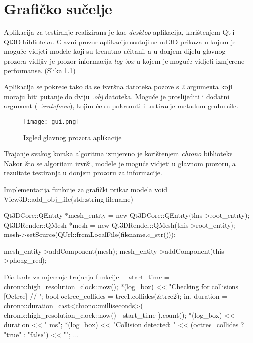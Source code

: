 \chapter{Grafičko sučelje}

Aplikacija za testiranje realizirana je kao \textit{desktop} aplikacija,
korištenjem Qt i Qt3D biblioteka. Glavni prozor aplikacije sastoji se od 
3D prikaza u kojem je moguće vidjeti modele koji su trenutno učitani, a
u donjem dijelu glavnog prozora vidljiv je prozor informacija \textit{log box}
u kojem je moguće vidjeti izmjerene performanse. (Slika \ref{gui})

Aplikacija se pokreće tako da se izvršna datoteka pozove s 2 argumenta koji moraju
biti putanje do dviju \textit{.obj} datoteka. Moguće je proslijediti i dodatni argument
(\textit{--bruteforce}), kojim će se pokrenuti i testiranje metodom grube sile.

\begin{figure}[h!]
    \centering
    \texttt{[image: gui.png]}
    \caption {Izgled glavnog prozora aplikacije}
    \label{gui}
\end{figure}

Trajanje svakog koraka algoritma izmjereno je korištenjem \textit{chrono} biblioteke
Nakon što se algoritam izvrši, modele je moguće vidjeti u glavnom prozoru, a rezultate
testiranja u donjem prozoru za informacije.

\begin{cppSource}{Implementacija funkcije za grafički prikaz modela}
void View3D::add_obj_file(std::string filename) {
    Qt3DCore::QEntity *mesh_entity = new Qt3DCore::QEntity(this->root_entity);
    Qt3DRender::QMesh *mesh = new Qt3DRender::QMesh(this->root_entity);
    mesh->setSource(QUrl::fromLocalFile(filename.c_str()));

    mesh_entity->addComponent(mesh);
    mesh_entity->addComponent(this->phong_red);
}
\end{cppSource}

\begin{cppSource}{Dio koda za mjerenje trajanja funkcije}
...
start_time = chrono::high_resolution_clock::now();
*(log_box) << "Checking for collisions [Octree] // ";
bool octree_collides = tree1.collides(&tree2);
int duration = chrono::duration_cast<chrono::milliseconds>(
    chrono::high_resolution_clock::now() - start_time
).count();
*(log_box) << duration << " ms\n";
*(log_box) << "Collision detected: "
           << (octree_collides ? "true" : "false") << "\n";
...
\end{cppSource}

